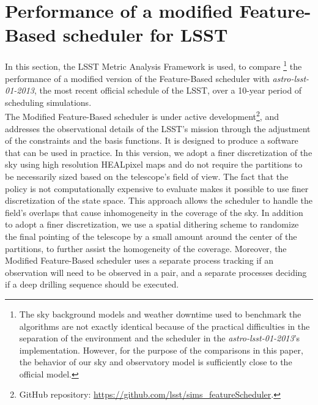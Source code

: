 \documentclass[11pt]{article}
\theoremstyle{definition}
\begin{document}
\section{Performance of a modified Feature-Based scheduler for LSST}\label{sec_comp}
In this section, the LSST Metric Analysis Framework \cite{jones2014lsst} is used, to compare \footnote{The sky background models and weather downtime used to benchmark the algorithms are not exactly identical because of the practical difficulties in the separation of the environment and the scheduler in the \textit{astro-lsst-01-2013}'s implementation. However, for the purpose of the comparisons in this paper, the behavior of our sky and observatory model is sufficiently close to the official model.} the performance of a modified version of the Feature-Based scheduler with \textit{astro-lsst-01-2013}, the most recent official schedule of the LSST, over a 10-year period of scheduling simulations.\\
The Modified Feature-Based scheduler is under active development\footnote{GitHub repository: \url{https://github.com/lsst/sims_featureScheduler}.}, and addresses the observational details of the LSST's mission through the adjustment of the constraints and the basis functions. It is designed to produce a software that can be used in practice. In this version, we adopt a finer discretization of the sky using high resolution HEALpixel maps and do not require the partitions to be necessarily sized based on the telescope's field of view. The fact that the policy is not computationally expensive to evaluate makes it possible to use finer discretization of the state space. This approach allows the scheduler to handle the field's overlaps that cause inhomogeneity in the coverage of the sky. In addition to adopt a finer discretization, we use a spatial dithering scheme to randomize the final pointing of the telescope by a small amount around the center of the partitions, to further assist the homogeneity of the coverage. Moreover, the Modified Feature-Based scheduler uses a separate process tracking if an observation will need to be observed in a pair, and a separate processes deciding if a deep drilling sequence should be executed.\\
%
\end{document}
